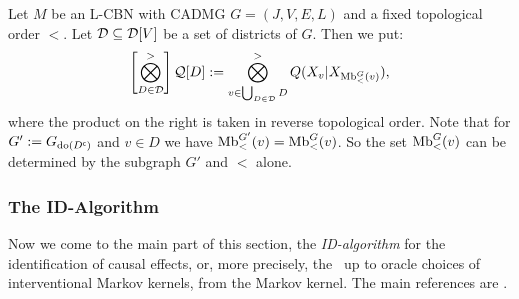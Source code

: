\begin{Def}
    \label{not:Q-dist}
        Let $M$ be an L-CBN with \observational CADMG $G=(J,V,E,L)$ and a fixed topological order $<$.
        Let  $\mathcal{D} \subseteq \mathcal{D}[V]$ be a set of districts of $G$. Then we put:
         \[ \left [ \bigotimes_{D \in \mathcal{D}}^>\right ] \mathcal{Q}[D] := \bigotimes_{v \in \bigcup_{D \in \mathcal{D}} D}^> Q(X_v|X_{\mathrm{Mb}^G_<(v)}),  \]
         where the product on the right is taken in reverse topological order.
         Note that for $G':=G_{\operatorname{do}(D^{\mathsf{c}})}$ and $v \in D$ we have $\mathrm{Mb}_<^{G'}(v)=\mathrm{Mb}_<^G(v)$. So the set $\mathrm{Mb}_<^G(v)$ 
         can be determined by the subgraph $G'$ and $<$ alone.
\end{Def}




\subsubsection{The ID-Algorithm}

Now we come to the main part of this section, the \emph{ID-algorithm} for the identification of causal effects, or, more precisely, the \trackability\ up to oracle choices of interventional Markov kernels, from the \observational Markov kernel. 
The main references are \cite{Pearl09,GP95s,Tian2002,TP02s,Tian04s,SP06,HV06s,HV08s,RERS17,FM20}.

